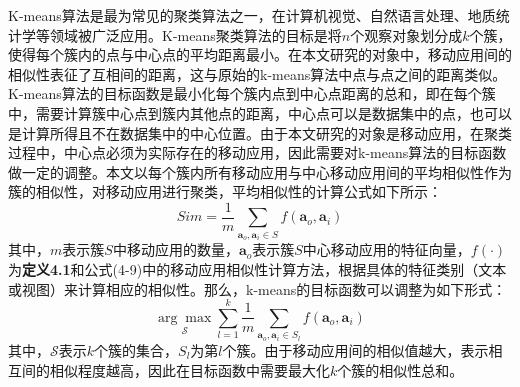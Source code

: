 K-means算法\cite{hartigan1979algorithm}是最为常见的聚类算法之一，在计算机视觉\cite{ray1999determination}、自然语言处理\cite{lin2009phrase}、地质统计学\cite{honarkhah2010stochastic}等领域被广泛应用。K-means聚类算法的目标是将$n$个观察对象划分成$k$个簇，使得每个簇内的点与中心点的平均距离最小。在本文研究的对象中，移动应用间的相似性表征了互相间的距离，这与原始的k-means算法中点与点之间的距离类似。K-means算法的目标函数是最小化每个簇内点到中心点距离的总和，即在每个簇中，需要计算簇中心点到簇内其他点的距离，中心点可以是数据集中的点，也可以是计算所得且不在数据集中的中心位置。由于本文研究的对象是移动应用，在聚类过程中，中心点必须为实际存在的移动应用，因此需要对k-means算法的目标函数做一定的调整。本文以每个簇内所有移动应用与中心移动应用间的平均相似性作为簇的相似性，对移动应用进行聚类，平均相似性的计算公式如下所示：
\begin{equation}
\mathit{Sim} = \frac{1}{m} \sum_{\mathbf{a}_o, \mathbf{a}_i \in S} f(\mathbf{a}_o, \mathbf{a}_i)
\end{equation}
其中，$m$表示簇$S$中移动应用的数量，$\mathbf{a}_o$表示簇$S$中心移动应用的特征向量，$f(\cdot)$为\textbf{定义4.1}和公式(4-9)中的移动应用相似性计算方法，根据具体的特征类别（文本或视图）来计算相应的相似性。那么，k-means的目标函数可以调整为如下形式：
\begin{equation}
\underset{\mathcal{S}}{\arg \max} \sum_{l=1}^{k} \frac{1}{m} \sum_{\mathbf{a}_o, \mathbf{a}_i \in S_l} f(\mathbf{a}_o, \mathbf{a}_i)
\end{equation}
其中，$\mathcal{S}$表示$k$个簇的集合，$S_l$为第$l$个簇。由于移动应用间的相似值越大，表示相互间的相似程度越高，因此在目标函数中需要最大化$k$个簇的相似性总和。

